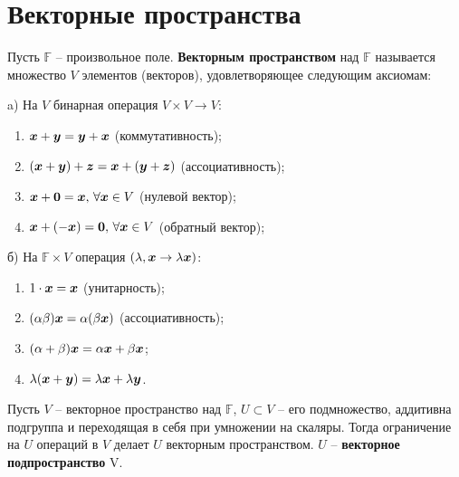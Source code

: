 \section{Векторные пространства}

\begin{to_def}
	Пусть $\mathbb{F}$ -- произвольное поле. \textbf{Векторным пространством} над $\mathbb{F}$ называется множество $V$ элементов (векторов), удовлетворяющее следующим аксиомам:

\begin{minipage}[t]{0.45\textwidth}
	\noindent
	a) На $V$ бинарная операция $V \times V \rightarrow V$:
	\begin{enumerate}[label = \Roman*.]
		\item $\mbox{\boldmath $x$} + \mbox{\boldmath $y$} = \mbox{\boldmath $y$} + \mbox{\boldmath $x$}$ (коммутативность);
		\item $(\mbox{\boldmath $x$} + \mbox{\boldmath $y$}) + \mbox{\boldmath $z$} = \mbox{\boldmath $x$} + (\mbox{\boldmath $y$} + \mbox{\boldmath $z$})$ (ассоциативность);
		\item $\mbox{\boldmath $x$} + \mbox{\boldmath $0$} = \mbox{\boldmath $x$}, \, \forall \mbox{\boldmath $x$}\in V$ (нулевой вектор);
		\item $\mbox{\boldmath $x$} + (-\mbox{\boldmath $x$}) = \mbox{\boldmath $0$}, \, \forall \mbox{\boldmath $x$} \in V$ (обратный вектор);
	\end{enumerate}
\end{minipage}
\hfill
\begin{minipage}[t]{0.45\textwidth}
	б) На $\mathbb{F} \times V$ операция $(\lambda, \mbox{\boldmath $x$} \rightarrow \lambda \mbox{\boldmath $x$})$:
	\begin{enumerate}[label = \Roman*., start = 5]
		\item $1 \cdot \mbox{\boldmath $x$} = \mbox{\boldmath $x$}$ (унитарность);
		\item $(\alpha \beta) \mbox{\boldmath $x$} = \alpha  (\beta \mbox{\boldmath $x$})$ (ассоциативность);
		\item $(\alpha + \beta) \mbox{\boldmath $x$} = \alpha \mbox{\boldmath $x$} + \beta \mbox{\boldmath $x$}$;
		\item $\lambda (\mbox{\boldmath $x$} +\mbox{\boldmath $y$}) = \lambda \mbox{\boldmath $x$} + \lambda \mbox{\boldmath $y$}$.
	\end{enumerate}
\end{minipage}
\end{to_def}

\begin{to_def}
	Пусть $V$ -- векторное пространство над $\mathbb{F}$, $U \subset V$ -- его подмножество, аддитивна подгруппа и переходящая в себя при умножении на скаляры. Тогда ограничение на $U$ операций в $V$ делает $U$ векторным пространством. $U$ -- \textbf{векторное подпространство} V.
\end{to_def}

